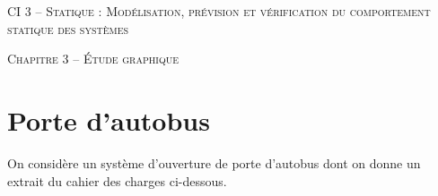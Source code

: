 \documentclass[11pt,oneside]{article}
\begin{document}
\pagestyle{fancy}
\renewcommand{\headrulewidth}{0pt}

\fancyhead{}

\fancyhead[C]{\rule{12cm}{.5pt}}


\renewcommand{\footrulewidth}{0.2pt}

\fancyfoot[C]{\footnotesize{\bfseries \thepage}}



\begin{center}
 \huge\textsc{CI 3 -- Statique : Modélisation, prévision et vérification du comportement statique des systèmes}
\end{center}

\begin{center}
 \LARGE\textsc{Chapitre 3 -- Étude graphique} 
\end{center}

\vspace{.5cm}

\section*{Porte d'autobus}

On considère un système d'ouverture de porte d'autobus dont on donne un extrait du cahier des charges ci-dessous.
\end{document}
